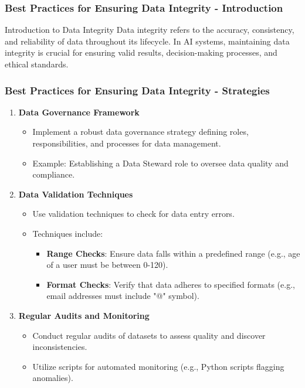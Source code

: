 \documentclass{beamer}
\begin{document}
\begin{frame}[fragile]
    \frametitle{Best Practices for Ensuring Data Integrity - Introduction}
    \begin{block}{Introduction to Data Integrity}
        Data integrity refers to the accuracy, consistency, and reliability of data throughout its lifecycle. In AI systems, maintaining data integrity is crucial for ensuring valid results, decision-making processes, and ethical standards.
    \end{block}
\end{frame}

\begin{frame}[fragile]
    \frametitle{Best Practices for Ensuring Data Integrity - Strategies}
    \begin{enumerate}
        \item \textbf{Data Governance Framework}
        \begin{itemize}
            \item Implement a robust data governance strategy defining roles, responsibilities, and processes for data management.
            \item Example: Establishing a Data Steward role to oversee data quality and compliance.
        \end{itemize}
        
        \item \textbf{Data Validation Techniques}
        \begin{itemize}
            \item Use validation techniques to check for data entry errors.
            \item Techniques include:
                \begin{itemize}
                    \item \textbf{Range Checks}: Ensure data falls within a predefined range (e.g., age of a user must be between 0-120).
                    \item \textbf{Format Checks}: Verify that data adheres to specified formats (e.g., email addresses must include "@" symbol).
                \end{itemize}
        \end{itemize}
        
        \item \textbf{Regular Audits and Monitoring}
        \begin{itemize}
            \item Conduct regular audits of datasets to assess quality and discover inconsistencies.
            \item Utilize scripts for automated monitoring (e.g., Python scripts flagging anomalies).
        \end{itemize}
    \end{enumerate}
\end{frame}
\end{document}
